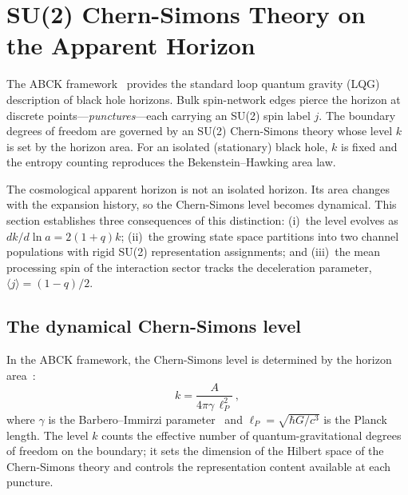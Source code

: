 \documentclass[aps,prd,twocolumn,10pt,superscriptaddress,nofootinbib]{revtex4-2}
\begin{document}
\section{SU(2) Chern-Simons Theory on the Apparent Horizon}
\label{sec:su2}

The ABCK framework~\cite{Ashtekar1998,Ashtekar2000} provides the
standard loop quantum gravity (LQG) description of black hole
horizons.  Bulk spin-network edges pierce the horizon at discrete
points---\emph{punctures}---each carrying an SU(2) spin label $j$.
The boundary degrees of freedom are governed by an SU(2)
Chern-Simons theory whose level $k$ is set by the horizon area.
For an isolated (stationary) black hole, $k$ is fixed and the
entropy counting reproduces the Bekenstein--Hawking area law.

The cosmological apparent horizon is not an isolated horizon.  Its
area changes with the expansion history, so the Chern-Simons level
becomes dynamical.  This section establishes three consequences of
this distinction: (i)~the level evolves as $dk/d\ln a = 2(1+q)k$;
(ii)~the growing state space partitions into two channel populations
with rigid SU(2) representation assignments; and (iii)~the mean
processing spin of the interaction sector tracks the deceleration
parameter, $\langle j \rangle = (1-q)/2$.


\subsection{The dynamical Chern-Simons level}
\label{sec:dynamical_k}

In the ABCK framework, the Chern-Simons level is determined by the
horizon area~\cite{Ashtekar1998}:
\begin{equation}
k = \frac{A}{4\pi\gamma\,\ell_P^2}\,,
\label{eq:CS_level}
\end{equation}
where $\gamma$ is the Barbero--Immirzi parameter~\cite{Barbero1995,Immirzi1997} and
$\ell_P = \sqrt{\hbar G/c^3}$ is the Planck length.  The level $k$
counts the effective number of quantum-gravitational degrees of
freedom on the boundary; it sets the dimension of the Hilbert space
of the Chern-Simons theory and controls the representation content
available at each puncture.
\end{document}
